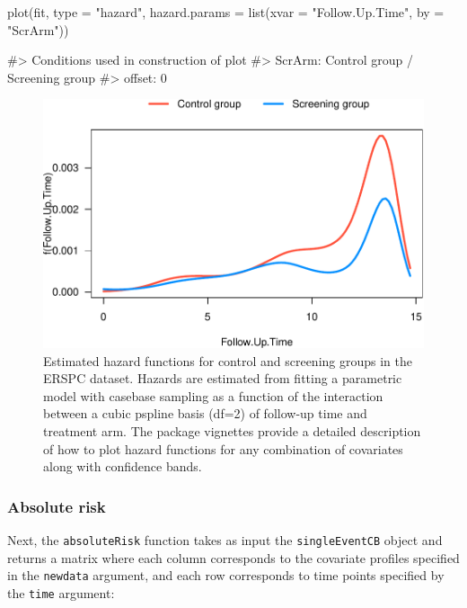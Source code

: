 \begin{Schunk}
\begin{Sinput}
plot(fit, type = "hazard",
     hazard.params = list(xvar = "Follow.Up.Time",
                          by = "ScrArm"))
\end{Sinput}
\begin{Soutput}
#> Conditions used in construction of plot
#> ScrArm: Control group / Screening group
#> offset: 0
\end{Soutput}
\begin{figure}[ht]
\includegraphics[width=\textwidth,keepaspectratio=true]{./cs1hazard-1} \caption[Estimated hazard functions for control and screening groups in the ERSPC dataset]{Estimated hazard functions for control and screening groups in the ERSPC dataset. Hazards are estimated from fitting a parametric model with casebase sampling as a function of the interaction between a cubic pspline basis (df=2) of follow-up time and treatment arm. The package vignettes provide a detailed description of how to plot hazard functions for any combination of covariates along with confidence bands.}\label{fig:cs1hazard}
\end{figure}
\end{Schunk}

\hypertarget{absolute-risk}{%
\subsubsection{Absolute risk}\label{absolute-risk}}

Next, the \texttt{absoluteRisk} function takes as input the \texttt{singleEventCB} object and returns a matrix where each column corresponds to the covariate profiles specified in the \texttt{newdata} argument, and each row corresponds to time points specified by the \texttt{time} argument:

